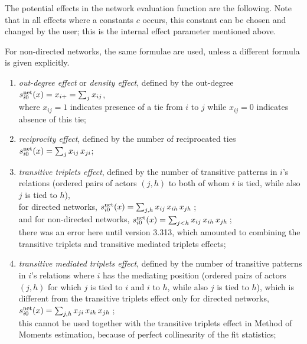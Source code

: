 \documentclass[a4paper,fleqn]{article}
\newcommand{\+}{\, + \,}
\newcommand{\vit}{\theenumi}
\begin{document}
{The potential effects in the \hypertarget{T_objective}{network
evaluation function}
are the following. Note that in all
effects where a constants $c$ occurs, this constant can be chosen
and changed by the user;
this is the internal effect parameter mentioned above.

For non-directed networks, the same formulae are used,
unless a different formula is given explicitly.
\begin{enumerate}
 \item {\em out-degree effect} or \emph{density effect},
 \hypertarget{T_density}{defined by the out-degree} \\
 $s^{\rm net}_{i\vit}(x) = x_{i+} = \sum_j x_{ij}$,\\
 where $x_{ij}=1$ indicates presence of a tie from $i$ to $j$
 while $x_{ij}=0$ indicates absence of this tie;

 \item {\em reciprocity effect},
 \hypertarget{T_reci}{defined by the number of reciprocated ties}\\
 $s^{\rm net}_{i\vit}(x) = \sum_j x_{ij}\,x_{ji}$;

 \item {\em transitive triplets effect}, defined by the number of transitive
 patterns in $i$'s relations (ordered pairs of actors
 $(j,h)$ to both of whom $i$ is tied, while also $j$ is tied to $h$),\\
 for directed networks,
  $s^{\rm net}_{i\vit}(x) =  \sum_{j, h} x_{ij}\, x_{ih}\, x_{jh}\,$;\\
 and for non-directed networks,
 $s^{\rm net}_{i\vit}(x) =  \sum_{j < h} x_{ij}\, x_{ih}\, x_{jh}\,$;\\
 there was an error here until version 3.313,
 which amounted to combining the transitive triplets and transitive
 mediated triplets effects;

 \item {\em transitive mediated triplets effect}, defined by the number of transitive
 patterns in $i$'s relations where $i$ has the
 mediating position (ordered pairs of actors
 $(j,h)$ for which $j$ is tied to $i$ and $i$ to $h$, while also $j$ is tied to $h$),
 which is different from the transitive triplets effect only for directed networks,\\
  $s^{\rm net}_{i\vit}(x) =  \sum_{j, h} x_{ji}\, x_{ih}\, x_{jh}\,$;\\
 this cannot be used together with the transitive triplets effect in
 Method of Moments estimation, because of perfect collinearity
 of the fit statistics;


\end{enumerate}}
\end{document}
